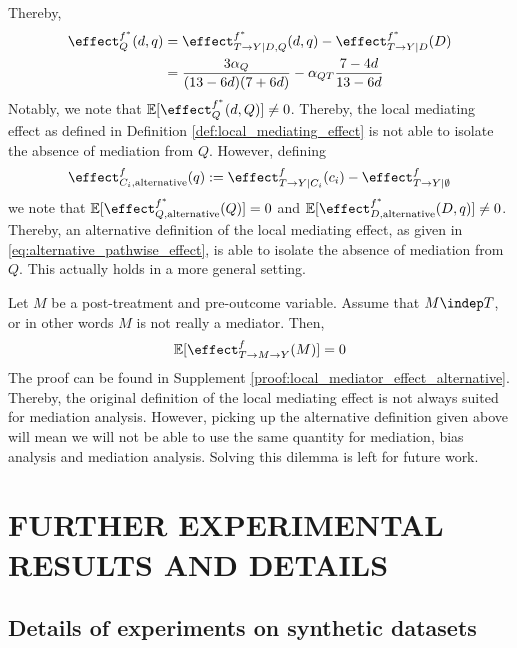 Thereby,
\begin{align*}
    \effect^{f^*}_{Q}(d,q)
    &= \effect^{f^*}_{T \rightarrow Y | D, Q}(d,q) - \effect^{f^*}_{T \rightarrow Y | D}(D) \\
    &= \frac{3\alpha_Q}{(13 - 6d)(7 + 6d)} - \alpha_{QT}\frac{7 - 4d}{13 - 6d}
\end{align*}
Notably, we note that $\mathbb{E}[\effect^{f^*}_{Q}(d,Q)] \neq 0$. Thereby, the local mediating effect as defined in Definition \ref{def:local_mediating_effect} is not able to isolate the absence of mediation from $Q$. However, defining
\begin{align} \label{eq:alternative_pathwise_effect}
    \effect^{f}_{C_i, \text{alternative}}(q) := \effect^{f}_{T \rightarrow Y | C_i}(c_i) - \effect^{f}_{T \rightarrow Y | \emptyset}
\end{align}
we note that $\mathbb{E}[\effect^{f^*}_{Q, \text{alternative}}(Q)] = 0$ and $\mathbb{E}[\effect^{f^*}_{D, \text{alternative}}(D,q)] \neq 0$. Thereby, an alternative definition of the local mediating effect, as given in \ref{eq:alternative_pathwise_effect}, is able to isolate the absence of mediation from $Q$. This actually holds in a more general setting.
\begin{property} \label{prop:local_mediator_effect_alternative} Let $M$ be a post-treatment and pre-outcome variable. %
Assume that $M \indep T$, or in other words $M$ is not really a mediator. Then, 
\begin{align*}
\mathbb{E}[\effect^f_{T \rightarrow M \rightarrow Y}(M)] = 0
\end{align*}
The proof can be found in Supplement \ref{proof:local_mediator_effect_alternative}. Thereby, the original definition of the local mediating effect is not always suited for mediation analysis. However, picking up the alternative definition given above will mean we will not be able to use the same quantity for mediation, bias analysis and mediation analysis. Solving this dilemma is left for future work.

\end{property}
\section{FURTHER EXPERIMENTAL RESULTS AND DETAILS}
\label{sec:exp_details}

\subsection{Details of experiments on synthetic datasets}

